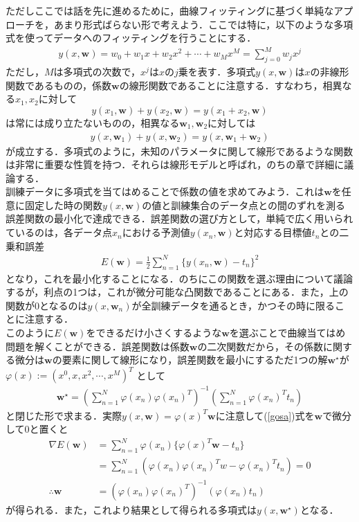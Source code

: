\documentclass{jsarticle}
\theoremstyle{definition}
\begin{document}
ただしここでは話を先に進めるために，曲線フィッティングに基づく単純なアプローチを，あまり形式ばらない形で考えよう．ここでは特に，以下のような多項式を使ってデータへのフィッティングを行うことにする．
\begin{equation}
\begin{split}
y(x,{\bm w}) = w_0 + w_1x + w_2x^2 + \cdots + w_Mx^M = \sum_{j=0}^M w_j x^j
\end{split}
\end{equation}
ただし，$M$は多項式の次数で，$x^j$は$x$の$j$乗を表す．多項式$y(x,{\bm w})$は$x$の非線形関数であるものの，係数${\bm w}$の線形関数であることに注意する．すなわち，相異なる$x_1,x_2$に対して
$$y(x_1,{\bm w}) + y(x_2,{\bm w}) = y(x_1+x_2,{\bm w})$$
は常には成り立たないものの，相異なる${\bm w}_1,{\bm w}_2$に対しては
\begin{align}
  y(x,{\bm w}_1) + y(x,{\bm w}_2) = y(x,{\bm w}_1 + {\bm w}_2)
\end{align}
が成立する．多項式のように，未知のパラメータに関して線形であるような関数は非常に重要な性質を持つ．それらは線形モデルと呼ばれ，のちの章で詳細に議論する．\\
訓練データに多項式を当てはめることで係数の値を求めてみよう．これは${\bm w}$を任意に固定した時の関数$y(x,{\bm w})$の値と訓練集合のデータ点との間のずれを測る誤差関数の最小化で達成できる．誤差関数の選び方として，単純で広く用いられているのは，各データ点$x_n$における予測値$y(x_n,{\bm w})$と対応する目標値$t_n$との二乗和誤差
\begin{align}
  \label{gosa}
E({\bm w}) = \frac{1}{2}\sum_{n=1}^N\{y(x_n,{\bm w}) - t_n\}^2
\end{align}
となり，これを最小化することになる．のちにこの関数を選ぶ理由について議論するが，利点の1つは，これが微分可能な凸関数であることにある．また，上の関数が$0$となるのは$y(x,{\bm w}_n)$が全訓練データを通るとき，かつその時に限ることに注意する．\\


このように$E({\bm w})$をできるだけ小さくするような$\bm w$を選ぶことで曲線当てはめ問題を解くことができる．誤差関数は係数$\bm w$の二次関数だから，その係数に関する微分は$\bm w$の要素に関して線形になり，誤差関数を最小にするただ1つの解$\bm w^{\star}$が
$\varphi(x) := (x^0 ,x,x^2,\cdots,x^M)^T$
として
\begin{align*}
\bm w^{\star} = \left( \sum_{n=1}^N\varphi(x_n)\varphi(x_n)^T \right)^{-1}\left( \sum_{n=1}^N\varphi(x_n)^T t_n \right)
\end{align*}
と閉じた形で求まる．実際$y(x,\bm w) = \varphi(x)^T \bm w$に注意して(\ref{gosa})式を${\bm w}$で微分して$0$と置くと
\begin{align*}
\nabla E(\bm w) &= \sum_{n=1}^N\varphi(x_n)\{\varphi(x)^T \bm w-t_n\}\\
                &= \sum_{n = 1}^N (\varphi(x_n)\varphi(x_n)^Tw - \varphi(x_n)^T t_n) = 0\\
                \therefore \bm w &= (\varphi(x_n) \varphi(x_n)^T)^{-1}(\varphi(x_n)t_n)
\end{align*}
が得られる．また，これより結果として得られる多項式は$y(x,\bm w^{\star})$となる．\\
\end{document}
